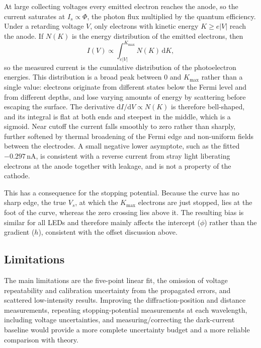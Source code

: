 \documentclass[12pt,a4paper]{article}
\begin{document}
At large collecting voltages every emitted electron reaches the anode, so the current saturates at \(I_s\propto\Phi\), the photon flux multiplied by the quantum efficiency. Under a retarding voltage \(V\), only electrons with kinetic energy \(K\ge e|V|\) reach the anode. If \(N(K)\) is the energy distribution of the emitted electrons, then
\[
I(V)\propto\int_{e|V|}^{K_{\max}}N(K)\,\mathrm{d}K,
\]
so the measured current is the cumulative distribution of the photoelectron energies. This distribution is a broad peak between \(0\) and \(K_{\max}\) rather than a single value: electrons originate from different states below the Fermi level and from different depths, and lose varying amounts of energy by scattering before escaping the surface. The derivative \(\mathrm{d}I/\mathrm{d}V\propto N(K)\) is therefore bell-shaped, and its integral is flat at both ends and steepest in the middle, which is a sigmoid. Near cutoff the current falls smoothly to zero rather than sharply, further softened by thermal broadening of the Fermi edge and non-uniform fields between the electrodes. A small negative lower asymptote, such as the fitted \(-0.297\,\mathrm{nA}\), is consistent with a reverse current from stray light liberating electrons at the anode together with leakage, and is not a property of the cathode.

This has a consequence for the stopping potential. Because the curve has no sharp edge, the true \(V_s\), at which the \(K_{\max}\) electrons are just stopped, lies at the foot of the curve, whereas the zero crossing lies above it. The resulting bias is similar for all LEDs and therefore mainly affects the intercept (\(\phi\)) rather than the gradient (\(h\)), consistent with the offset discussion above.

\subsection{Limitations}

The main limitations are the five-point linear fit, the omission of voltage repeatability and calibration uncertainty from the propagated errors, and scattered low-intensity results. Improving the diffraction-position and distance measurements, repeating stopping-potential measurements at each wavelength, including voltage uncertainties, and measuring/correcting the dark-current baseline would provide a more complete uncertainty budget and a more reliable comparison with theory.

\newpage
\end{document}
